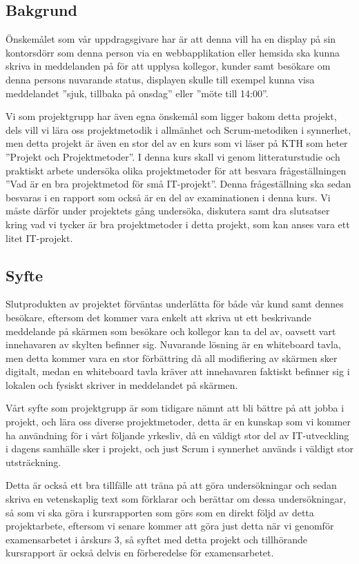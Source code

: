 \documentclass[11pt]{article}
\begin{document}
\subsection{Bakgrund}
\label{sec:org8048687}
Önskemålet som vår uppdragsgivare har är att denna vill ha en display på
sin kontorsdörr som denna person via en webbapplikation eller hemsida
ska kunna skriva in meddelanden på för att upplysa kollegor, kunder samt
besökare om denna persons nuvarande status, displayen skulle till
exempel kunna visa meddelandet ”sjuk, tillbaka på onsdag” eller ”möte
till 14:00”.

Vi som projektgrupp har även egna önskemål som ligger bakom detta
projekt, dels vill vi lära oss projektmetodik i allmänhet och
Scrum-metodiken i synnerhet, men detta projekt är även en stor del av en
kurs som vi läser på KTH som heter ”Projekt och Projektmetoder”. I denna
kurs skall vi genom litteraturstudie och praktiskt arbete undersöka
olika projektmetoder för att besvara frågeställningen ”Vad är en bra
projektmetod för små IT-projekt”. Denna frågeställning ska sedan
besvaras i en rapport som också är en del av examinationen i denna kurs.
Vi måste därför under projektets gång undersöka, diskutera samt dra
slutsatser kring vad vi tycker är bra projektmetoder i detta projekt,
som kan anses vara ett litet IT-projekt.

\subsection{Syfte}
\label{sec:orgc441f92}
Slutprodukten av projektet förväntas underlätta för både vår kund samt
dennes besökare, eftersom det kommer vara enkelt att skriva ut ett
beskrivande meddelande på skärmen som besökare och kollegor kan ta del
av, oavsett vart innehavaren av skylten befinner sig. Nuvarande lösning
är en whiteboard tavla, men detta kommer vara en stor förbättring då all
modifiering av skärmen sker digitalt, medan en whiteboard tavla kräver
att innehavaren faktiskt befinner sig i lokalen och fysiskt skriver in
meddelandet på skärmen.

Vårt syfte som projektgrupp är som tidigare nämnt att bli bättre på att
jobba i projekt, och lära oss diverse projektmetoder, detta är en
kunskap som vi kommer ha användning för i vårt följande yrkesliv, då en
väldigt stor del av IT-utveckling i dagens samhälle sker i projekt, och
just Scrum i synnerhet används i väldigt stor utsträckning.

Detta är också ett bra tillfälle att träna på att göra undersökningar
och sedan skriva en vetenskaplig text som förklarar och berättar om
dessa undersökningar, så som vi ska göra i kursrapporten som görs som en
direkt följd av detta projektarbete, eftersom vi senare kommer att göra
just detta när vi genomför examensarbetet i årskurs 3, så syftet med
detta projekt och tillhörande kursrapport är också delvis en
förberedelse för examensarbetet.
\end{document}
